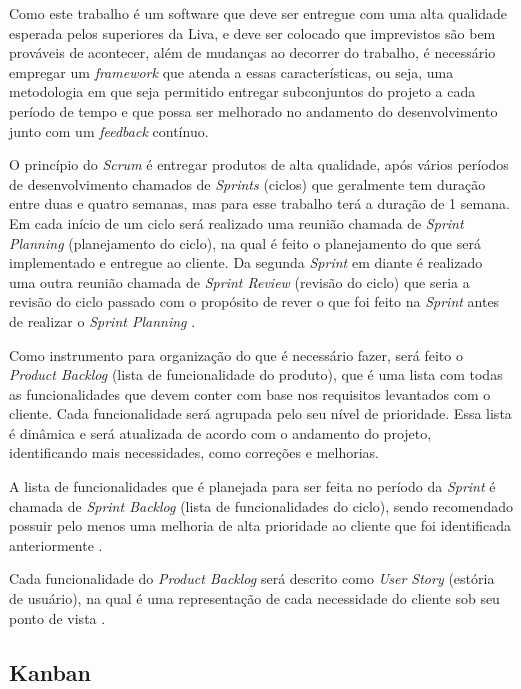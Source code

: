 Como este trabalho é um software que deve ser entregue com uma alta qualidade esperada pelos superiores da Liva, e deve ser colocado que imprevistos são bem prováveis de acontecer, além de mudanças ao decorrer do trabalho, é necessário empregar um \textit{framework} que atenda a essas características, ou seja, uma metodologia em que seja permitido entregar subconjuntos do projeto a cada período de tempo e que possa ser melhorado no andamento do desenvolvimento junto com um \textit{feedback} contínuo.

O princípio do \textit{Scrum} é entregar produtos de alta qualidade, após vários períodos de desenvolvimento chamados de \textit{Sprints} (ciclos) que geralmente tem duração entre duas e quatro semanas, mas para esse trabalho terá a duração de 1 semana. Em cada início de um ciclo será realizado uma reunião chamada de \textit{Sprint Planning} (planejamento do ciclo), na qual é feito o planejamento do que será implementado e entregue ao cliente. Da segunda \textit{Sprint} em diante é realizado uma outra reunião chamada de \textit{Sprint Review} (revisão do ciclo) que seria a revisão do ciclo passado com o propósito de rever o que foi feito na \textit{Sprint} antes de realizar o \textit{Sprint Planning} \cite{ijcf94}.

Como instrumento para organização do que é necessário fazer, será feito o \textit{Product Backlog} (lista de funcionalidade do produto), que é uma lista com todas as funcionalidades que devem conter com base nos requisitos levantados com o cliente. Cada funcionalidade será agrupada pelo seu nível de prioridade. Essa lista é dinâmica e será atualizada de acordo com o andamento do projeto, identificando mais necessidades, como correções e melhorias.

A lista de funcionalidades que é planejada para ser feita no período da \textit{Sprint} é chamada de \textit{Sprint Backlog} (lista de funcionalidades do ciclo), sendo recomendado possuir pelo menos uma melhoria de alta prioridade ao cliente que foi identificada anteriormente \cite{ijcf94}.

Cada funcionalidade do \textit{Product Backlog} será descrito como \textit{User Story} (estória de usuário), na qual é uma representação de cada necessidade do cliente sob seu ponto de vista \cite{knowledge21:2019}.

\subsection{Kanban}
\label{section_kanban}

